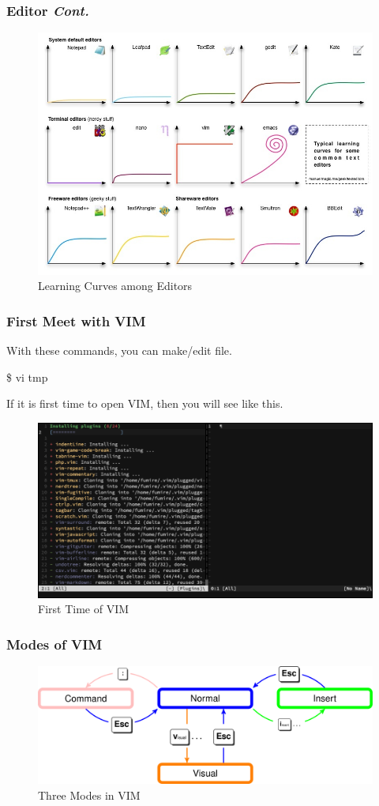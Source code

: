\documentclass{beamer}
\begin{document}
	\begin{frame}
		\frametitle{Editor \textit{Cont.}}
		\begin{figure}[h!]
			\centering
			\includegraphics[width=0.7 \linewidth]{figures/curves.jpg}
			\caption{Learning Curves among Editors}
		\end{figure}
	\end{frame}

	\begin{frame}
		\frametitle{First Meet with VIM}
		With these commands, you can make/edit file.
		\begin{example}
			\$ vi tmp
		\end{example}
	
		If it is first time to open VIM, then you will see like this. 
		\begin{figure}[h!]
			\centering
			\includegraphics[width=0.5 \linewidth]{figures/9.png}
			\caption{First Time of VIM}
		\end{figure}
	\end{frame}

	\begin{frame}
		\frametitle{Modes of VIM}
		\begin{figure}[h!]
			\centering
			\includegraphics[width=0.7 \linewidth]{figures/modes.png}
			\caption{Three Modes in VIM}
		\end{figure}
	\end{frame}
\end{document}
